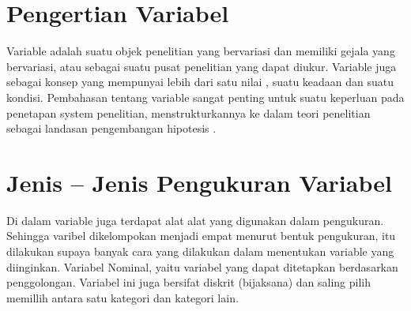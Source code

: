 

\section{Pengertian Variabel}
Variable adalah suatu objek penelitian yang bervariasi dan memiliki gejala yang bervariasi, atau sebagai suatu pusat penelitian yang dapat 
diukur. Variable juga sebagai konsep yang mempunyai  lebih dari satu nilai , suatu keadaan dan suatu kondisi. Pembahasan tentang variable 
sangat  penting  untuk suatu keperluan pada penetapan system penelitian, menstrukturkannya ke dalam teori penelitian sebagai landasan 
pengembangan hipotesis .  

\section{Jenis – Jenis Pengukuran Variabel}
Di dalam variable juga terdapat alat alat yang digunakan dalam pengukuran. Sehingga varibel dikelompokan menjadi empat menurut bentuk   
pengukuran, itu dilakukan supaya banyak cara yang dilakukan dalam menentukan variable yang diinginkan. Variabel Nominal, yaitu variabel
yang dapat ditetapkan berdasarkan penggolongan. Variabel ini juga bersifat diskrit (bijaksana) dan saling pilih memillih antara satu 
kategori dan kategori lain.


